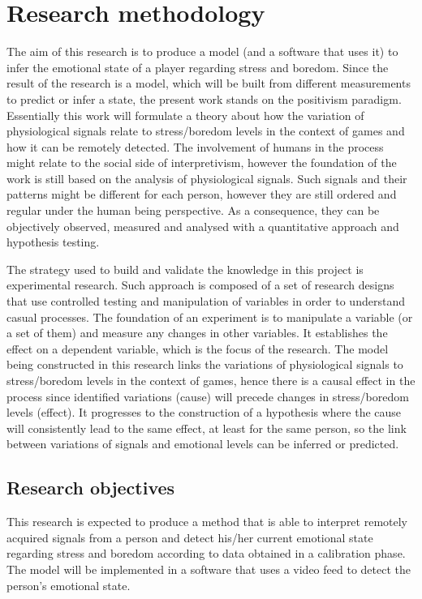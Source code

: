 \chapter{Research methodology}

The aim of this research is to produce a model (and a software that uses it) to infer the emotional state of a player regarding stress and boredom. Since the result of the research is a model, which will be built from different measurements to predict or infer a state, the present work stands on the positivism paradigm. Essentially this work will formulate a theory about how the variation of physiological signals relate to stress/boredom levels in the context of games and how it can be remotely detected. The involvement of humans in the process might relate to the social side of interpretivism, however the foundation of the work is still based on the analysis of physiological signals. Such signals and their patterns might be different for each person, however they are still ordered and regular under the human being perspective. As a consequence, they can be objectively observed, measured and analysed with a quantitative approach and hypothesis testing.

The strategy used to build and validate the knowledge in this project is experimental research. Such approach is composed of a set of research designs that use controlled testing and manipulation of variables in order to understand casual processes. The foundation of an experiment is to manipulate a variable (or a set of them) and measure any changes in other variables. It establishes the effect on a dependent variable, which is the focus of the research. The model being constructed in this research links the variations of physiological signals to stress/boredom levels in the context of games, hence there is a causal effect in the process since identified variations (cause) will precede changes in stress/boredom levels (effect). It progresses to the construction of a hypothesis where the cause will consistently lead to the same effect, at least for the same person, so the link between variations of signals and emotional levels can be inferred or predicted.

\section{Research objectives}

This research is expected to produce a method that is able to interpret remotely acquired signals from a person and detect his/her current emotional state regarding stress and boredom according to data obtained in a calibration phase. The model will be implemented in a software that uses a video feed to detect the person's emotional state.

